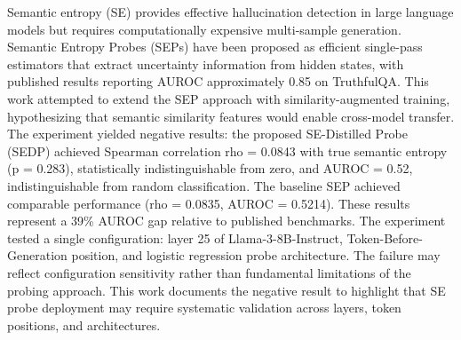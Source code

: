 
Semantic entropy (SE) provides effective hallucination detection in large language models but requires computationally expensive multi-sample generation. Semantic Entropy Probes (SEPs) have been proposed as efficient single-pass estimators that extract uncertainty information from hidden states, with published results reporting AUROC approximately 0.85 on TruthfulQA. This work attempted to extend the SEP approach with similarity-augmented training, hypothesizing that semantic similarity features would enable cross-model transfer. The experiment yielded negative results: the proposed SE-Distilled Probe (SEDP) achieved Spearman correlation rho = 0.0843 with true semantic entropy (p = 0.283), statistically indistinguishable from zero, and AUROC = 0.52, indistinguishable from random classification. The baseline SEP achieved comparable performance (rho = 0.0835, AUROC = 0.5214). These results represent a 39\% AUROC gap relative to published benchmarks. The experiment tested a single configuration: layer 25 of Llama-3-8B-Instruct, Token-Before-Generation position, and logistic regression probe architecture. The failure may reflect configuration sensitivity rather than fundamental limitations of the probing approach. This work documents the negative result to highlight that SE probe deployment may require systematic validation across layers, token positions, and architectures.
